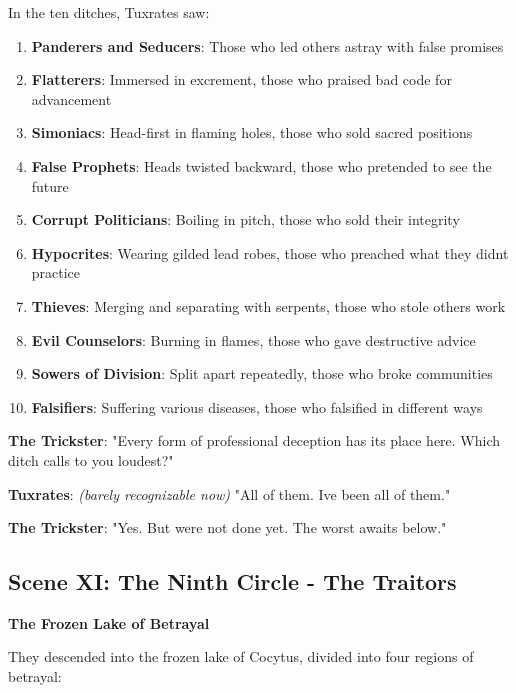 In the ten ditches, Tuxrates saw:

\begin{enumerate}
\def\labelenumi{\arabic{enumi}.}
\tightlist
\item
  \textbf{Panderers and Seducers}: Those who led others astray with false promises
\item
  \textbf{Flatterers}: Immersed in excrement, those who praised bad code for advancement
\item
  \textbf{Simoniacs}: Head-first in flaming holes, those who sold sacred positions
\item
  \textbf{False Prophets}: Heads twisted backward, those who pretended to see the future
\item
  \textbf{Corrupt Politicians}: Boiling in pitch, those who sold their integrity
\item
  \textbf{Hypocrites}: Wearing gilded lead robes, those who preached what they didn\textquotesingle t practice
\item
  \textbf{Thieves}: Merging and separating with serpents, those who stole others\textquotesingle{} work
\item
  \textbf{Evil Counselors}: Burning in flames, those who gave destructive advice
\item
  \textbf{Sowers of Division}: Split apart repeatedly, those who broke communities
\item
  \textbf{Falsifiers}: Suffering various diseases, those who falsified in different ways
\end{enumerate}

\textbf{The Trickster}: "Every form of professional deception has its place here. Which ditch calls to you loudest?"

\textbf{Tuxrates}: \emph{(barely recognizable now)} "All of them. I\textquotesingle ve been all of them."

\textbf{The Trickster}: "Yes. But we\textquotesingle re not done yet. The worst awaits below."

\bookdivider

\subsection{Scene XI: The Ninth Circle - The Traitors}\label{scene-xi-the-ninth-circle---the-traitors}

\textbf{The Frozen Lake of Betrayal}

They descended into the frozen lake of Cocytus, divided into four regions of betrayal:

